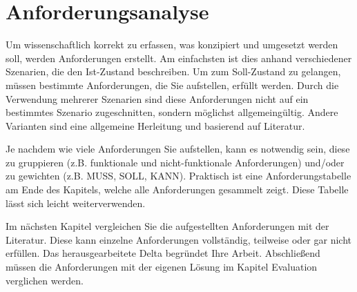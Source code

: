 \chapter{Anforderungsanalyse}
\label{sec:anforderungsanalyse}

Um wissenschaftlich korrekt zu erfassen, was konzipiert und umgesetzt werden soll, werden Anforderungen erstellt. Am einfachsten ist dies anhand verschiedener Szenarien, die den Ist-Zustand beschreiben. Um zum Soll-Zustand zu gelangen, müssen bestimmte Anforderungen, die Sie aufstellen, erfüllt werden. Durch die Verwendung mehrerer Szenarien sind diese Anforderungen nicht auf ein bestimmtes Szenario zugeschnitten, sondern möglichst allgemeingültig. Andere Varianten sind eine allgemeine Herleitung und basierend auf Literatur.

Je nachdem wie viele Anforderungen Sie aufstellen, kann es notwendig sein, diese zu gruppieren (z.B. funktionale und nicht-funktionale Anforderungen) und/oder zu gewichten (z.B. MUSS, SOLL, KANN). Praktisch ist eine Anforderungstabelle am Ende des Kapitels, welche alle Anforderungen gesammelt zeigt. Diese Tabelle lässt sich leicht weiterverwenden.

Im nächsten Kapitel vergleichen Sie die aufgestellten Anforderungen mit der Literatur. Diese kann einzelne Anforderungen vollständig, teilweise oder gar nicht erfüllen. Das herausgearbeitete Delta begründet Ihre Arbeit. Abschließend müssen die Anforderungen mit der eigenen Lösung im Kapitel Evaluation verglichen werden.
